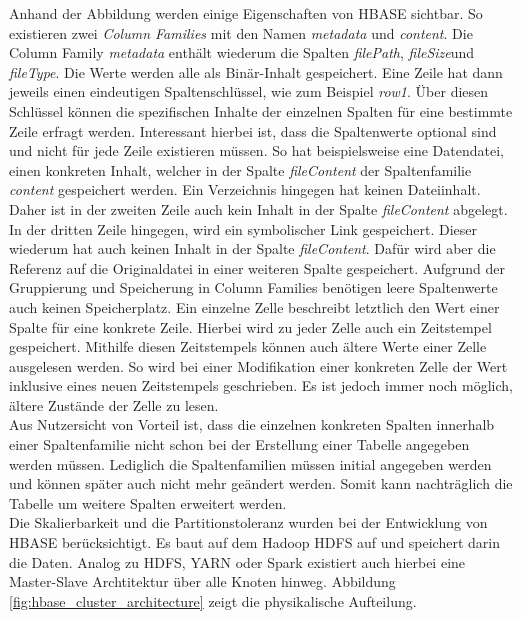 \noindent
Anhand der Abbildung werden einige Eigenschaften von HBASE sichtbar. So existieren zwei \textit{Column Families} mit den Namen \textit{metadata} und \textit{content}. Die Column Family \textit{metadata} enthält wiederum die Spalten \textit{filePath}, \textit{fileSize}und \textit{fileType}. Die Werte werden alle als Binär-Inhalt gespeichert. Eine Zeile hat dann jeweils einen eindeutigen Spaltenschlüssel, wie zum Beispiel \textit{row1}. 
Über diesen Schlüssel können die spezifischen Inhalte der einzelnen Spalten für eine bestimmte Zeile erfragt werden. Interessant hierbei ist, dass die Spaltenwerte optional sind und nicht für jede Zeile existieren müssen. So hat beispielsweise eine Datendatei, einen konkreten Inhalt, welcher in der Spalte \textit{fileContent} der Spaltenfamilie \textit{content} gespeichert werden. Ein Verzeichnis hingegen hat keinen Dateiinhalt. Daher ist in der zweiten Zeile auch kein Inhalt in der Spalte \textit{fileContent} abgelegt. In der dritten Zeile hingegen, wird ein symbolischer Link gespeichert. Dieser wiederum hat auch keinen Inhalt in der Spalte \textit{fileContent}. Dafür wird aber die Referenz auf die Originaldatei in einer weiteren Spalte gespeichert. Aufgrund der Gruppierung und Speicherung in Column Families benötigen leere Spaltenwerte auch keinen Speicherplatz. 
Ein einzelne Zelle beschreibt letztlich den Wert einer Spalte für eine konkrete Zeile. Hierbei wird zu jeder Zelle auch ein Zeitstempel gespeichert. Mithilfe diesen Zeitstempels können auch ältere Werte einer Zelle ausgelesen werden. 
So wird bei einer Modifikation einer konkreten Zelle der Wert inklusive eines neuen Zeitstempels geschrieben. Es ist jedoch immer noch möglich, ältere Zustände der Zelle zu lesen.\\
Aus Nutzersicht von Vorteil ist, dass die einzelnen konkreten Spalten innerhalb einer Spaltenfamilie nicht schon bei der Erstellung einer Tabelle angegeben werden müssen. Lediglich die Spaltenfamilien müssen initial angegeben werden und können später auch nicht mehr geändert werden. Somit kann nachträglich die Tabelle um weitere Spalten erweitert werden.\cite[S. 577]{hadoop_definitive_guide}\\

\noindent
Die Skalierbarkeit und die Partitionstoleranz wurden bei der Entwicklung von HBASE berücksichtigt. Es baut auf dem Hadoop HDFS auf und speichert darin die Daten. Analog zu HDFS, YARN oder Spark existiert auch hierbei eine Master-Slave Archtitektur über alle Knoten hinweg. Abbildung \ref{fig:hbase_cluster_architecture} zeigt die physikalische Aufteilung.\\

